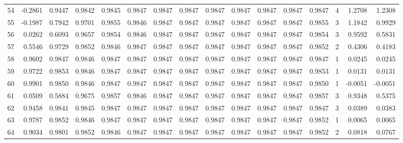 \begin{tabular}{lrrrrrrrrrrrrrrr}
54  &     -0.2861 &  0.9447 &  0.9842 &  0.9845 &  0.9847 &  0.9847 &  0.9847 &  0.9847 &  0.9847 &  0.9847 &   0.9847 &     0.9847 &      4 &                    1.2708 &                     1.2308 \\
55  &     -0.1987 &  0.7942 &  0.9701 &  0.9855 &  0.9846 &  0.9847 &  0.9847 &  0.9847 &  0.9847 &  0.9847 &   0.9847 &     0.9855 &      3 &                    1.1842 &                     0.9929 \\
56  &      0.0262 &  0.6093 &  0.9657 &  0.9854 &  0.9846 &  0.9847 &  0.9847 &  0.9847 &  0.9847 &  0.9847 &   0.9847 &     0.9854 &      3 &                    0.9592 &                     0.5831 \\
57  &      0.5546 &  0.9729 &  0.9852 &  0.9846 &  0.9847 &  0.9847 &  0.9847 &  0.9847 &  0.9847 &  0.9847 &   0.9847 &     0.9852 &      2 &                    0.4306 &                     0.4183 \\
58  &      0.9602 &  0.9847 &  0.9846 &  0.9847 &  0.9847 &  0.9847 &  0.9847 &  0.9847 &  0.9847 &  0.9847 &   0.9847 &     0.9847 &      1 &                    0.0245 &                     0.0245 \\
59  &      0.9722 &  0.9853 &  0.9846 &  0.9847 &  0.9847 &  0.9847 &  0.9847 &  0.9847 &  0.9847 &  0.9847 &   0.9847 &     0.9853 &      1 &                    0.0131 &                     0.0131 \\
60  &      0.9901 &  0.9850 &  0.9846 &  0.9847 &  0.9847 &  0.9847 &  0.9847 &  0.9847 &  0.9847 &  0.9847 &   0.9847 &     0.9850 &      1 &                   -0.0051 &                    -0.0051 \\
61  &      0.0509 &  0.5884 &  0.9675 &  0.9857 &  0.9846 &  0.9847 &  0.9847 &  0.9847 &  0.9847 &  0.9847 &   0.9847 &     0.9857 &      3 &                    0.9348 &                     0.5375 \\
62  &      0.9458 &  0.9841 &  0.9845 &  0.9847 &  0.9847 &  0.9847 &  0.9847 &  0.9847 &  0.9847 &  0.9847 &   0.9847 &     0.9847 &      3 &                    0.0389 &                     0.0383 \\
63  &      0.9787 &  0.9852 &  0.9846 &  0.9847 &  0.9847 &  0.9847 &  0.9847 &  0.9847 &  0.9847 &  0.9847 &   0.9847 &     0.9852 &      1 &                    0.0065 &                     0.0065 \\
64  &      0.9034 &  0.9801 &  0.9852 &  0.9846 &  0.9847 &  0.9847 &  0.9847 &  0.9847 &  0.9847 &  0.9847 &   0.9847 &     0.9852 &      2 &                    0.0818 &                     0.0767 \\

\end{tabular}

